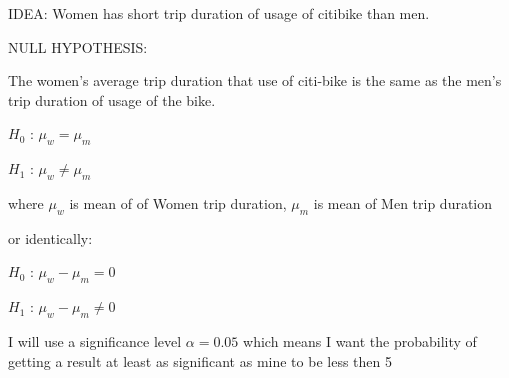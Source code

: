 IDEA:
Women has short trip duration of usage of citibike than men.

NULL HYPOTHESIS:

The women's average trip duration that use of citi-bike is the same as the men's trip duration of usage of the bike.


$H_0$ : $\mu_w  = \mu_m $ 

$H_1$ : $\mu_w  \neq \mu_m $ 

where $\mu_w$ is mean of of Women trip duration, $\mu_m$ is mean of Men trip duration

or identically:

$H_0$ : $\mu_w - \mu_m   = 0 $

$H_1$ : $\mu_w  - \mu_m   \neq 0 $

 I will use a significance level  $\alpha=0.05$
 which means I want the probability of getting a result at least as significant as mine to be less then 5%